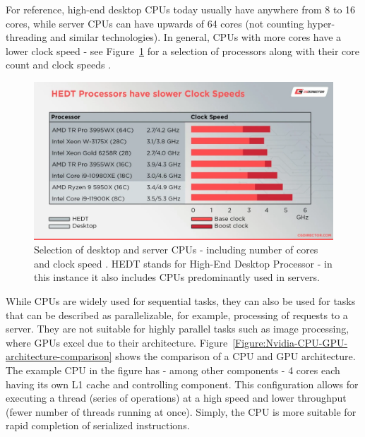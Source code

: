 \par For reference, high-end desktop CPUs today usually have anywhere from 8 to 16 cores, while server CPUs can have upwards of 64 cores (not counting hyper-threading and similar technologies). In general, CPUs with more cores have a lower clock speed - see Figure~\ref{Figure:processor-comparison} for a selection of processors along with their core count and clock speeds \cite{Glawion7March2022}.

\begin{figure}[H]
	\centering
	\includegraphics[width=14cm, keepaspectratio]{images/ch1/processors_comparison.png}
	\caption{Selection of desktop and server CPUs - including number of cores and clock speed \cite{Glawion7March2022}. HEDT stands for High-End Desktop Processor - in this instance it also includes CPUs predominantly used in servers.}
	\label{Figure:processor-comparison}
\end{figure}

While CPUs are widely used for sequential tasks, they can also be used for tasks that can be described as parallelizable, for example, processing of requests to a server. They are not suitable for highly parallel tasks such as image processing, where GPUs excel due to their architecture. Figure~\ref{Figure:Nvidia-CPU-GPU-architecture-comparison} shows the comparison of a CPU and GPU architecture. The example CPU in the figure has - among other components - 4 cores each having its own L1 cache and controlling component. This configuration allows for executing a thread (series of operations) at a high speed and lower throughput (fewer number of threads running at once). Simply, the CPU is more suitable for rapid completion of serialized instructions.

